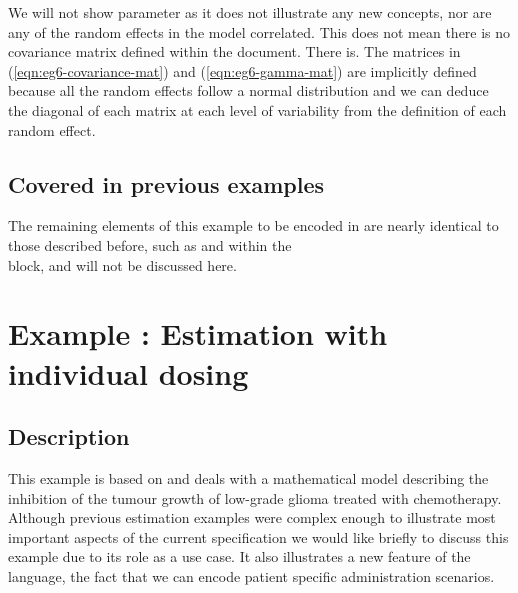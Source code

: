 We will not show parameter  as it does not illustrate any new
concepts, nor are any of the random effects in the model
correlated. This does not mean there is no covariance matrix defined
within the \pharmml document. There is. The matrices in
(\ref{eqn:eg6-covariance-mat}) and (\ref{eqn:eg6-gamma-mat}) are
implicitly defined because all the random effects follow a normal
distribution and we can deduce the diagonal of each matrix at each
level of variability from the definition of each random effect.

\subsection{Covered in previous examples}
The remaining elements of this example to be encoded in \pharmml
are nearly identical to those described before, such as 
and  within the\\  block,
and will not be discussed here.







\section{Example \theexamples: Estimation with individual dosing}
\label{sec:Ribba}

\subsection{Description}
This example is based on \cite{Ribba:2012uq} and deals with a mathematical
model describing the inhibition of the tumour growth of low-grade glioma treated
with chemotherapy. Although previous estimation examples were complex
enough to illustrate most important aspects of the current \pharmml specification we would
like briefly to discuss this example due to its role as a use case. It also illustrates a new feature
of the language, the fact that we can encode patient specific administration scenarios.


